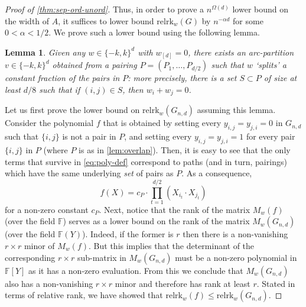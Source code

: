 \documentclass[10pt,a4paper]{article}
\newtheorem{lem}[theorem]{Lemma}
\theoremstyle{definition}%
\theoremstyle{plain}
\newcommand{\rk}{\mathrm{relrk}}
\newcommand{\F}{\mathbb F}
\begin{document}
\begin{proof}[Proof of \autoref{thm:sep-ord-unord}]
    Thus, in order to prove a $n^{\Omega(d)}$ lower bound on the width of $A$, it suffices to lower bound $\rk_w(G)$ by $n^{-\alpha d}$ for some $0 < \alpha < 1/2$.
    We prove such a lower bound using the following lemma.

    \begin{lem}\label{lem:overlap}
        Given any $w\in\{-k,k\}^d$ with $w_{[d]} = 0$, there exists an arc-partition $v\in\{-k,k\}^d$ obtained from a pairing $P = (P_1,\ldots,P_{d/2})$ such that $w$ `splits' a constant fraction of the pairs in $P$: more precisely, there is a set $S\subset P$ of size at least $d/8$ such that if $(i,j) \in S$, then $w_i + w_j = 0$.
    \end{lem}

    Let us first prove the lower bound on $\rk_w(G_{n,d})$ assuming this lemma. 
    Consider the polynomial $f$ that is obtained by setting every $y_{i,j} = y_{j,i} = 0$ in $G_{n,d}$ such that $\{i,j\}$ is not a pair in $P$, and setting every $y_{i,j} = y_{j,i} = 1$ for every pair $\{i,j\}$ in $P$ (where $P$ is as in \autoref{lem:overlap}). 
    Then, it is easy to see that the only terms that survive in \autoref{eq:poly-def} correspond to paths (and in turn, pairings) which have the same underlying \emph{set} of pairs as $P$. 
    As a consequence,
    \[
        f(X)= c_P \cdot \prod_{t = 1}^{d/2} (X_{i_t}\cdot X_{j_t})
    \]
    for a non-zero constant $c_P$.
    Next, notice that the rank of the matrix $M_w(f)$ (over the field $\F$) serves as a lower bound on the rank of the matrix $M_w(G_{n,d})$ (over the field $\F(Y)$).
    Indeed, if the former is $r$ then there is a non-vanishing $r\times r$ minor of $M_w(f)$. 
    But this implies that the determinant of the corresponding $r\times r$ sub-matrix in $M_w(G_{n,d})$ must be a non-zero polynomial in $\F[Y]$ as it has a non-zero evaluation.
    From this we conclude that $M_w(G_{n,d})$ also has a non-vanishing $r\times r$ minor and therefore has rank at least $r$. 
    Stated in terms of relative rank, we have showed that $\rk_w(f)\leq \rk_w(G_{n,d})$.


\end{proof}
\end{document}

